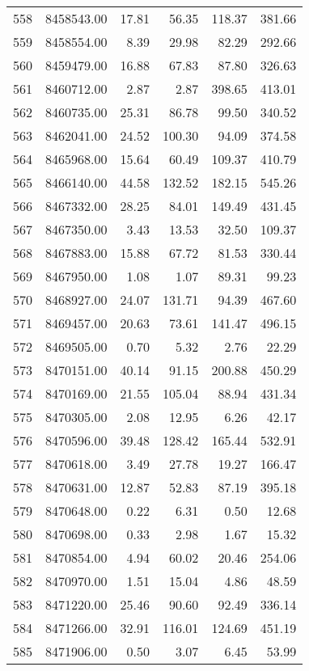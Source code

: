 \begin{table}[ht]
\begin{tabular}{rrrrrr}
  558 & 8458543.00 & 17.81 & 56.35 & 118.37 & 381.66 \\ 
  559 & 8458554.00 & 8.39 & 29.98 & 82.29 & 292.66 \\ 
  560 & 8459479.00 & 16.88 & 67.83 & 87.80 & 326.63 \\ 
  561 & 8460712.00 & 2.87 & 2.87 & 398.65 & 413.01 \\ 
  562 & 8460735.00 & 25.31 & 86.78 & 99.50 & 340.52 \\ 
  563 & 8462041.00 & 24.52 & 100.30 & 94.09 & 374.58 \\ 
  564 & 8465968.00 & 15.64 & 60.49 & 109.37 & 410.79 \\ 
  565 & 8466140.00 & 44.58 & 132.52 & 182.15 & 545.26 \\ 
  566 & 8467332.00 & 28.25 & 84.01 & 149.49 & 431.45 \\ 
  567 & 8467350.00 & 3.43 & 13.53 & 32.50 & 109.37 \\ 
  568 & 8467883.00 & 15.88 & 67.72 & 81.53 & 330.44 \\ 
  569 & 8467950.00 & 1.08 & 1.07 & 89.31 & 99.23 \\ 
  570 & 8468927.00 & 24.07 & 131.71 & 94.39 & 467.60 \\ 
  571 & 8469457.00 & 20.63 & 73.61 & 141.47 & 496.15 \\ 
  572 & 8469505.00 & 0.70 & 5.32 & 2.76 & 22.29 \\ 
  573 & 8470151.00 & 40.14 & 91.15 & 200.88 & 450.29 \\ 
  574 & 8470169.00 & 21.55 & 105.04 & 88.94 & 431.34 \\ 
  575 & 8470305.00 & 2.08 & 12.95 & 6.26 & 42.17 \\ 
  576 & 8470596.00 & 39.48 & 128.42 & 165.44 & 532.91 \\ 
  577 & 8470618.00 & 3.49 & 27.78 & 19.27 & 166.47 \\ 
  578 & 8470631.00 & 12.87 & 52.83 & 87.19 & 395.18 \\ 
  579 & 8470648.00 & 0.22 & 6.31 & 0.50 & 12.68 \\ 
  580 & 8470698.00 & 0.33 & 2.98 & 1.67 & 15.32 \\ 
  581 & 8470854.00 & 4.94 & 60.02 & 20.46 & 254.06 \\ 
  582 & 8470970.00 & 1.51 & 15.04 & 4.86 & 48.59 \\ 
  583 & 8471220.00 & 25.46 & 90.60 & 92.49 & 336.14 \\ 
  584 & 8471266.00 & 32.91 & 116.01 & 124.69 & 451.19 \\ 
  585 & 8471906.00 & 0.50 & 3.07 & 6.45 & 53.99 \\ 

\end{tabular}
\end{table}
